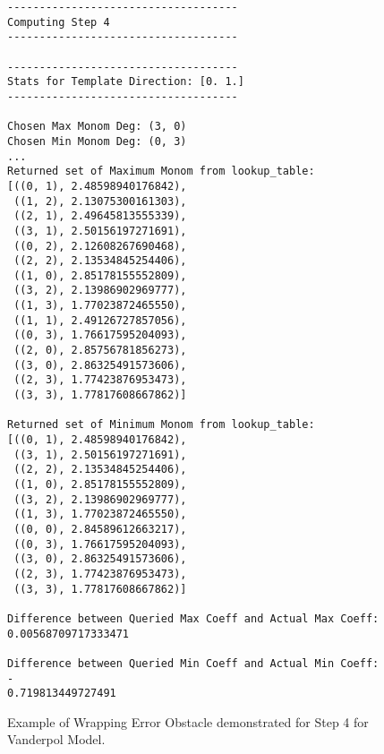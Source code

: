 \begin{figure}
\begin{verbatim}
------------------------------------
Computing Step 4
------------------------------------

------------------------------------
Stats for Template Direction: [0. 1.]
------------------------------------

Chosen Max Monom Deg: (3, 0)
Chosen Min Monom Deg: (0, 3)
...
Returned set of Maximum Monom from lookup_table:
[((0, 1), 2.48598940176842),
 ((1, 2), 2.13075300161303),
 ((2, 1), 2.49645813555339),
 ((3, 1), 2.50156197271691),
 ((0, 2), 2.12608267690468),
 ((2, 2), 2.13534845254406),
 ((1, 0), 2.85178155552809),
 ((3, 2), 2.13986902969777),
 ((1, 3), 1.77023872465550),
 ((1, 1), 2.49126727857056),
 ((0, 3), 1.76617595204093),
 ((2, 0), 2.85756781856273),
 ((3, 0), 2.86325491573606),
 ((2, 3), 1.77423876953473),
 ((3, 3), 1.77817608667862)]

Returned set of Minimum Monom from lookup_table:
[((0, 1), 2.48598940176842),
 ((3, 1), 2.50156197271691),
 ((2, 2), 2.13534845254406),
 ((1, 0), 2.85178155552809),
 ((3, 2), 2.13986902969777),
 ((1, 3), 1.77023872465550),
 ((0, 0), 2.84589612663217),
 ((0, 3), 1.76617595204093),
 ((3, 0), 2.86325491573606),
 ((2, 3), 1.77423876953473),
 ((3, 3), 1.77817608667862)]

Difference between Queried Max Coeff and Actual Max Coeff:
0.00568709717333471

Difference between Queried Min Coeff and Actual Min Coeff: -
0.719813449727491
\end{verbatim}

\caption{Example of Wrapping Error Obstacle demonstrated for Step 4 for Vanderpol Model.}
\label{fig:bern_prune_wrapping_output}
\end{figure}
